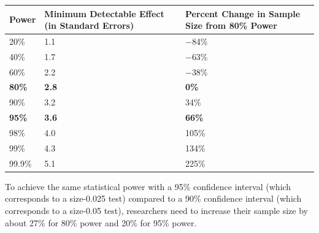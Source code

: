 \documentclass[12pt]{article}
\let\origtable\table
\let\endorigtable\endtable
\renewenvironment{table}[1][]{\origtable[htbp]}{\endorigtable}
\newcommand{\headrow}{}
\begin{document}
\begin{table}[h]
\centering
\caption{This table is an alternative version of Table~\ref{tbl:mdes} for researchers who wish to use a 95\% confidence interval rather than a 90\% confidence interval. The table shows the minimum detectable effect, in standard errors, for a variety of power levels. We can use these values to find the minimum detectable effect for power levels other than 80\% and 95\% (as in Rule~\ref{rule:se-to-mde}). We can also use these factors rather than 2.5 for 80\% power (or 3.3 for 95\% power) in the relevant rules. For convenience, this table also shows the percent change in sample size required to change the statistical power from 80\% to the various levels.}\label{tbl:mdes2}
\footnotesize %
\renewcommand{\tabularxcolumn}[1]{>{\centering\arraybackslash}m{#1}} %
\setlength{\extrarowheight}{4pt} %
\begin{tabularx}{\linewidth}{XXX} %
\toprule
\headrow \textbf{Power} & \textbf{Minimum Detectable Effect (in Standard Errors)} & \textbf{Percent Change in Sample Size from 80\% Power} \\
\midrule
20\%   & 1.1 & $-$84\% \\
40\%   & 1.7 & $-$63\% \\
60\%   & 2.2 & $-$38\% \\
\textbf{80\%}   & \textbf{2.8} & \textbf{0\%} \\
90\%   & 3.2 & 34\% \\
\textbf{95\%}   & \textbf{3.6} & \textbf{66\%} \\
98\%   & 4.0 & 105\% \\
99\%   & 4.3 & 134\% \\
99.9\%  & 5.1 & 225\% \\
\bottomrule
\end{tabularx}
\end{table}

To achieve the same statistical power with a 95\% confidence interval (which corresponds to a size-0.025 test) compared to a 90\% confidence interval (which corresponds to a size-0.05 test), researchers need to increase their sample size by about 27\% for 80\% power and 20\% for 95\% power.
\end{document}
